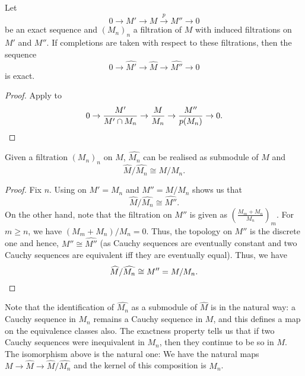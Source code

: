 \begin{cor} \label{cor:completion-exact-induced-filtrations}
	Let 
	\begin{equation*} 
		0 \to M' \to M \xrightarrow{p} M'' \to 0
	\end{equation*}
	be an exact sequence and $(M_{n})_{n}$ a filtration of $M$ with induced filtrations on $M'$ and $M''$. If completions are taken with respect to these filtrations, then the sequence
	\begin{equation*} 
		0 \to \widehat{M'} \to \widehat{M} \to \widehat{M''} \to 0
	\end{equation*}
	is exact.
\end{cor}
\begin{proof} 
	Apply  to
	\begin{equation*} 
		0 \to \frac{M'}{M' \cap M_{n}} \to \frac{M}{M_{n}} \to \frac{M''}{p(M_{n})} \to 0. \qedhere
	\end{equation*}
\end{proof}

\begin{cor} \label{cor:completion-quotient-filtration}
	Given a filtration $(M_{n})_{n}$ on $M$, $\widehat{M_{n}}$ can be realised as submodule of $\widehat{M}$ and 
	\begin{equation} \label{eq:09}
		\widehat{M}/\widehat{M_{n}} \cong M/M_{n}.
	\end{equation}
\end{cor}
\begin{proof} 
	Fix $n$. Using  on $M' = M_{n}$ and $M'' = M/M_{n}$ shows us that
	\begin{equation*} 
		\widehat{M}/\widehat{M_{n}} \cong \widehat{M''}.
	\end{equation*}
	On the other hand, note that the filtration on $M''$ is given as $\left(\frac{M_{m} + M_{n}}{M_{n}}\right)_{m}$. For $m \ge n$, we have $(M_{m} + M_{n})/M_{n} = 0$. Thus, the topology on $M''$ is the discrete one and hence, $M'' \cong \widehat{M''}$ (as Cauchy sequences are eventually constant and two Cauchy sequences are equivalent iff they are eventually equal). Thus, we have
	\begin{equation*} 
		\widehat{M}/\widehat{M_{n}} \cong M'' = M/M_{n}. \qedhere
	\end{equation*}
\end{proof}

Note that the identification of $\widehat{M_{n}}$ as a submodule of $\widehat{M}$ is in the natural way: a Cauchy sequence in $M_{n}$ remains a Cauchy sequence in $M$, and this defines a map on the equivalence classes also. The exactness property tells us that if two Cauchy sequences were inequivalent in $M_{n}$, then they continue to be so in $M$. The isomorphism above is the natural one: We have the natural maps $M \to \widehat{M} \to \widehat{M}/\widehat{M_{n}}$ and the kernel of this composition is $M_{n}$.

